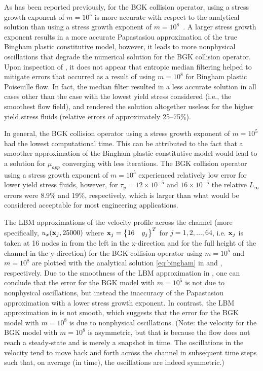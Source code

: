 As has been reported previously, for the BGK collision operator, using a stress growth exponent of $m = 10^5$ is more accurate with respect to the analytical solution than using a stress growth exponent of $m = 10^8$~\cite{chen2014simulations}.
A larger stress growth exponent results in a more accurate Papastasiou approximation of the true Bingham plastic constitutive model, however, it leads to more nonphysical oscillations that degrade the numerical solution for the BGK collision operator.
Upon inspection of , it does not appear that entropic median filtering helped to mitigate errors that occurred as a result of using $m = 10^8$ for Bingham plastic Poiseuille flow.
In fact, the median filter resulted in a less accurate solution in all cases other than the case with the lowest yield stress considered (i.e., the smoothest flow field), and rendered the solution altogether useless for the higher yield stress fluids (relative errors of approximately 25--75\%).

In general, the BGK collision operator using a stress growth exponent of $m = 10^5$ had the lowest computational time.
This can be attributed to the fact that a smoother approximation of the Bingham plastic constitutive model would lead to a solution for $\mu_{app}$ converging with less iterations.
The BGK collision operator using a stress growth exponent of $m = 10^5$ experienced relatively low error for lower yield stress fluids, however, for $\tau_y = 12 \times 10^{-5}$ and $16 \times 10^{-5}$ the relative $L_\infty$ errors were 8.9\% and 19\%, respectively, which is larger than what would be considered acceptable for most engineering applications.

The LBM approximations of the velocity profile across the channel (more specifically, $u_x(\mathbf{x}_j, 25000)$ where $\mathbf{x}_j = \begin{Bmatrix}16 & y_j\end{Bmatrix}^T$ for $j = 1, 2, ..., 64$, i.e. $\mathbf{x}_j$ is taken at 16 nodes in from the left in the x-direction and for the full height of the channel in the y-direction) for the BGK collision operator using $m = 10^5$ and $m = 10^8$ are plotted with the analytical solution \eqref{eq:bingham} in  and , respectively.
Due to the smoothness of the LBM approximation in , one can conclude that the error for the BGK model with $m = 10^5$ is not due to nonphysical oscillations, but instead the inaccuracy of the Papastasiou approximation with a lower stress growth exponent.
In contrast, the LBM approximation in  is not smooth, which suggests that the error for the BGK model with $m = 10^8$ is due to nonphysical oscillations. (Note: the velocity for the BGK model with $m = 10^8$ is asymmetric, but that is because the flow does not reach a steady-state and  is merely a snapshot in time.
The oscillations in the velocity tend to move back and forth across the channel in subsequent time steps such that, on average (in time), the oscillations are indeed symmetric.)

